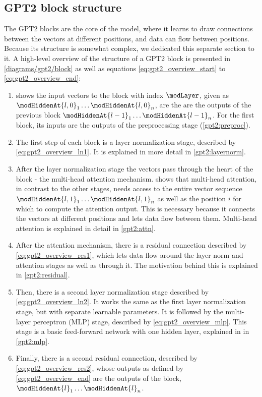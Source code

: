 \subsection{GPT2 block structure}
\label{gpt2:block}

The GPT2 blocks are the core of the model, where it learns to draw connections between the vectors at different positions, and data can flow between positions.
Because its structure is somewhat complex, we dedicated this separate section to it.
A high-level overview of the structure of a GPT2 block is presented in \cref{diagrams/gpt2/block} as well as equations \eqref{eq:gpt2_overview_start} to \eqref{eq:gpt2_overview_end}:

\begin{enumerate}
	\item {} shows the input vectors to the block with index $\modLayer$, given as $\modHiddenAt{l, 0}_1 \ldots \modHiddenAt{l, 0}_n$, are the are the outputs of the previous block $\modHiddenAt{l-1}_1 \ldots \modHiddenAt{l-1}_n$. For the first block, its inputs are the outputs of the preprocessing stage (\cref{gpt2:preproc}).
	
	\item The first step of each block is a layer normalization stage, described by \cref{eq:gpt2_overview_ln1}. It is explained in more detail in \cref{gpt2:layernorm}.
	
	\item After the layer normalization stage the vectors pass through the heart of the block - the multi-head attention mechanism.  shows that multi-head attention, in contrast to the other stages, needs access to the entire vector sequence $\modHiddenAt{l, 1}_1 \ldots \modHiddenAt{l, 1}_n$ as well as the position $i$ for which to compute the attention output. This is necessary because it connects the vectors at different positions and lets data flow between them. Multi-head attention is explained in detail in \cref{gpt2:attn}.
	
	\item After the attention mechanism, there is a residual connection described by \cref{eq:gpt2_overview_res1}, which lets data flow around the layer norm and attention stages as well as through it. The motivation behind this is explained in \cref{gpt2:residual}.
	
	\item Then, there is a second layer normalization stage described by \cref{eq:gpt2_overview_ln2}. It works the same as the first layer normalization stage, but with separate learnable parameters. It is followed by the multi-layer perceptron (MLP) stage, described by \cref{eq:gpt2_overview_mlp}. This stage is a basic feed-forward network with one hidden layer, explained in in \cref{gpt2:mlp}.
	
	\item Finally, there is a second residual connection, described by \cref{eq:gpt2_overview_res2}, whose outputs as defined by \cref{eq:gpt2_overview_end} are the outputs of the block, $\modHiddenAt{l}_1 \ldots \modHiddenAt{l}_n$.
\end{enumerate}


